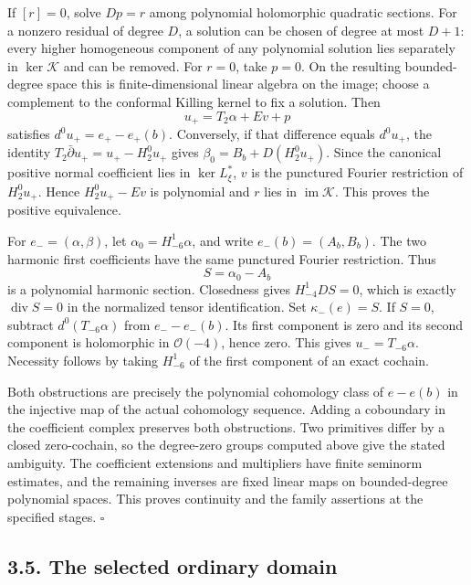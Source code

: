 \documentclass[
  english,
  11pt,
  reqno]{amsart}
\begin{document}
If \([r]=0\), solve \(Dp=r\) among polynomial holomorphic quadratic
sections. For a nonzero residual of degree \(D\), a solution can be
chosen of degree at most \(D+1\): every higher homogeneous component of
any polynomial solution lies separately in \(\ker\mathcal K\) and can be
removed. For \(r=0\), take \(p=0\). On the resulting bounded-degree
space this is finite-dimensional linear algebra on the image; choose a
complement to the conformal Killing kernel to fix a solution. Then \[
u_+=T_2\alpha+Ev+p
\] satisfies \(d^0u_+=e_+-e_+(b)\). Conversely, if that difference
equals \(d^0u_+\), the identity \(T_2\bar\partial u_+=u_+-H_2^0u_+\)
gives \(\beta_0=B_b+D(H_2^0u_+)\). Since the canonical positive normal
coefficient lies in \(\ker L_\xi^*\), \(v\) is the punctured Fourier
restriction of \(H_2^0u_+\). Hence \(H_2^0u_+-Ev\) is polynomial and
\(r\) lies in \(\operatorname{im}\mathcal K\). This proves the positive
equivalence.

For \(e_-=(\alpha,\beta)\), let \(\alpha_0=H_{-6}^1\alpha\), and write
\(e_-(b)=(A_b,B_b)\). The two harmonic first coefficients have the same
punctured Fourier restriction. Thus \[
S=\alpha_0-A_b
\] is a polynomial harmonic section. Closedness gives \(H_{-4}^1DS=0\),
which is exactly \(\operatorname{div}S=0\) in the normalized tensor
identification. Set \(\kappa_-(e)=S\). If \(S=0\), subtract
\(d^0(T_{-6}\alpha)\) from \(e_--e_-(b)\). Its first component is zero
and its second component is holomorphic in \(\mathcal O(-4)\), hence
zero. This gives \(u_-=T_{-6}\alpha\). Necessity follows by taking
\(H_{-6}^1\) of the first component of an exact cochain.

Both obstructions are precisely the polynomial cohomology class of
\(e-e(b)\) in the injective map of the actual cohomology sequence.
Adding a coboundary in the coefficient complex preserves both
obstructions. Two primitives differ by a closed zero-cochain, so the
degree-zero groups computed above give the stated ambiguity. The
coefficient extensions and multipliers have finite seminorm estimates,
and the remaining inverses are fixed linear maps on bounded-degree
polynomial spaces. This proves continuity and the family assertions at
the specified stages. \hfill\(\square\)

\subsection{3.5. The selected ordinary
domain}\label{the-selected-ordinary-domain}\label{sec:online-selected-ordinary-domain}
\end{document}
